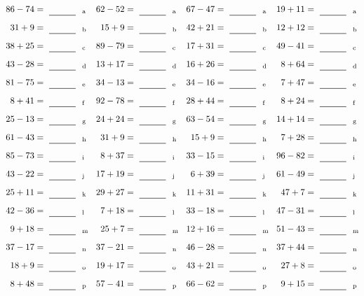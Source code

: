 \documentclass
[
  draft    = true,
  fontsize = 11pt,
  parskip  = half-
]
{scrartcl}
\begin{document}
\clearpage
\begin{align*}
    \pline{86-74}&=\rline{a}
  & \pline{62-52}&=\rline{a}
  & \pline{67-47}&=\rline{a}
  & \pline{19+11}&=\rline{a} \\[1ex]
    \pline{31+9}&=\rline{b}
  & \pline{15+9}&=\rline{b}
  & \pline{42+21}&=\rline{b}
  & \pline{12+12}&=\rline{b} \\[1ex]
    \pline{38+25}&=\rline{c}
  & \pline{89-79}&=\rline{c}
  & \pline{17+31}&=\rline{c}
  & \pline{49-41}&=\rline{c} \\[1ex]
    \pline{43-28}&=\rline{d}
  & \pline{13+17}&=\rline{d}
  & \pline{16+26}&=\rline{d}
  & \pline{8+64}&=\rline{d} \\[1ex]
    \pline{81-75}&=\rline{e}
  & \pline{34-13}&=\rline{e}
  & \pline{34-16}&=\rline{e}
  & \pline{7+47}&=\rline{e} \\[1ex]
    \pline{8+41}&=\rline{f}
  & \pline{92-78}&=\rline{f}
  & \pline{28+44}&=\rline{f}
  & \pline{8+24}&=\rline{f} \\[1ex]
    \pline{25-13}&=\rline{g}
  & \pline{24+24}&=\rline{g}
  & \pline{63-54}&=\rline{g}
  & \pline{14+14}&=\rline{g} \\[1ex]
    \pline{61-43}&=\rline{h}
  & \pline{31+9}&=\rline{h}
  & \pline{15+9}&=\rline{h}
  & \pline{7+28}&=\rline{h} \\[1ex]
    \pline{85-73}&=\rline{i}
  & \pline{8+37}&=\rline{i}
  & \pline{33-15}&=\rline{i}
  & \pline{96-82}&=\rline{i} \\[1ex]
    \pline{43-22}&=\rline{j}
  & \pline{17+19}&=\rline{j}
  & \pline{6+39}&=\rline{j}
  & \pline{61-49}&=\rline{j} \\[1ex]
    \pline{25+11}&=\rline{k}
  & \pline{29+27}&=\rline{k}
  & \pline{11+31}&=\rline{k}
  & \pline{47+7}&=\rline{k} \\[1ex]
    \pline{42-36}&=\rline{l}
  & \pline{7+18}&=\rline{l}
  & \pline{33-18}&=\rline{l}
  & \pline{47-31}&=\rline{l} \\[1ex]
    \pline{9+18}&=\rline{m}
  & \pline{25+7}&=\rline{m}
  & \pline{12+16}&=\rline{m}
  & \pline{51-43}&=\rline{m} \\[1ex]
    \pline{37-17}&=\rline{n}
  & \pline{37-21}&=\rline{n}
  & \pline{46-28}&=\rline{n}
  & \pline{37+44}&=\rline{n} \\[1ex]
    \pline{18+9}&=\rline{o}
  & \pline{19+17}&=\rline{o}
  & \pline{43+21}&=\rline{o}
  & \pline{27+8}&=\rline{o} \\[1ex]
    \pline{8+48}&=\rline{p}
  & \pline{57-41}&=\rline{p}
  & \pline{66-62}&=\rline{p}
  & \pline{9+15}&=\rline{p}
\end{align*}
\end{document}
